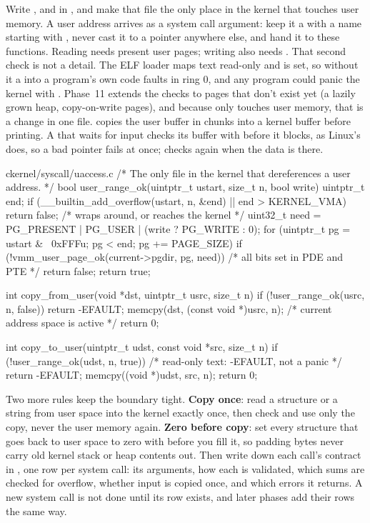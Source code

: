\documentclass[11pt,a4paper]{article}
\begin{document}
Write ,  and  in , and
make that file the only place in the kernel that touches user memory. A user address arrives as a 
system call argument: keep it a  with a name starting with , never cast it to a pointer
anywhere else, and hand it to these functions. Reading needs present user pages; writing also needs .
That second check is not a detail. The ELF loader maps text read-only and  is set, so without it a
 into a program's own code faults in ring 0, and any program could panic the kernel with
. Phase~11 extends the checks to pages that don't exist yet (a lazily grown heap,
copy-on-write pages), and because only  touches user memory, that is a change in one file.
 copies the user buffer in chunks into a kernel buffer before printing. A  that waits
for input checks its buffer with  before it blocks, as Linux's  does, so a bad
pointer fails at once;  checks again when the data is there.

\begin{lst}{c}{kernel/syscall/uaccess.c}
/* The only file in the kernel that dereferences a user address. */
bool user_range_ok(uintptr_t ustart, size_t n, bool write)
{
    uintptr_t end;
    if (__builtin_add_overflow(ustart, n, &end) || end > KERNEL_VMA)
        return false;                                   /* wraps around, or reaches the kernel */
    uint32_t need = PG_PRESENT | PG_USER | (write ? PG_WRITE : 0);
    for (uintptr_t pg = ustart & ~0xFFFu; pg < end; pg += PAGE_SIZE)
        if (!vmm_user_page_ok(current->pgdir, pg, need))  /* all bits set in PDE and PTE */
            return false;
    return true;
}

int copy_from_user(void *dst, uintptr_t usrc, size_t n)
{
    if (!user_range_ok(usrc, n, false))
        return -EFAULT;
    memcpy(dst, (const void *)usrc, n);                 /* current address space is active */
    return 0;
}

int copy_to_user(uintptr_t udst, const void *src, size_t n)
{
    if (!user_range_ok(udst, n, true))                  /* read-only text: -EFAULT, not a panic */
        return -EFAULT;
    memcpy((void *)udst, src, n);
    return 0;
}
\end{lst}

Two more rules keep the boundary tight. \textbf{Copy once}: read a structure or a string from user space into the
kernel exactly once, then check and use only the copy, never the user memory again. \textbf{Zero before copy}: set
every structure that goes back to user space to zero with  before you fill it, so padding bytes never
carry old kernel stack or heap contents out. Then write down each call's contract in
, one row per system call: its arguments, how each is validated, which sums are
checked for overflow, whether input is copied once, and which errors it returns. A new system call is not done until
its row exists, and later phases add their rows the same way.
\end{document}
